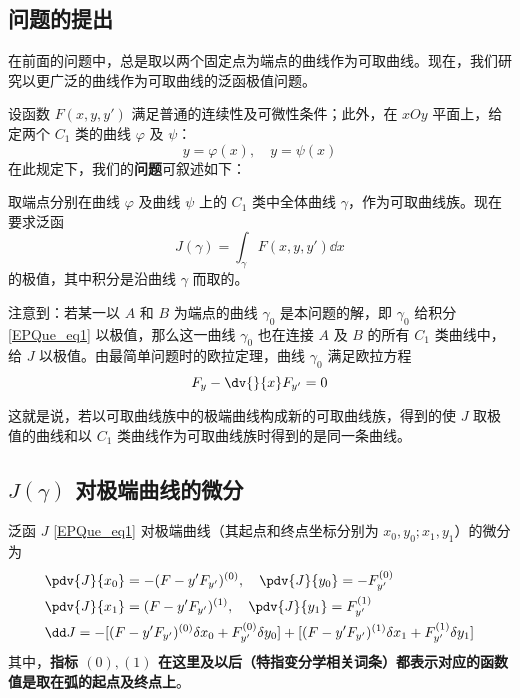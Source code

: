 

\subsection{问题的提出}\label{EPQue_sub1}在前面的问题中，总是取以两个固定点为端点的曲线作为可取曲线。现在，我们研究以更广泛的曲线作为可取曲线的泛函极值问题。

设函数 $F(x,y,y')$ 满足普通的连续性及可微性条件；此外，在 $xOy$ 平面上，给定两个 $C_1$ 类的曲线 $\varphi$ 及 $\psi$：
\begin{equation}
y=\varphi(x),\quad y=\psi(x)
\end{equation}
在此规定下，我们的\textbf{问题}可叙述如下：

取端点分别在曲线 $\varphi$ 及曲线 $\psi$ 上的 $C_1$ 类中全体曲线 $\gamma$，作为可取曲线族。现在要求泛函
\begin{equation}\label{EPQue_eq1}
J(\gamma)=\int_\gamma F(x,y,y')\dd x
\end{equation}
的极值，其中积分是沿曲线 $\gamma$ 而取的。

注意到：若某一以 $A$ 和 $B$ 为端点的曲线 $\gamma_0$ 是本问题的解，即 $\gamma_0$ 给积分\autoref{EPQue_eq1} 以极值，那么这一曲线 $\gamma_0$ 也在连接 $A$ 及 $B$ 的所有 $C_1$ 类曲线中，给 $J$ 以极值。由最简单问题时的欧拉定理，曲线 $\gamma_0$ 满足欧拉方程
\begin{equation}
F_y-\dv{}{x}F_{y'}=0
\end{equation}

这就是说，若以可取曲线族中的极端曲线构成新的可取曲线族，得到的使 $J$ 取极值的曲线和以 $C_1$ 类曲线作为可取曲线族时得到的是同一条曲线。
\subsection{$J(\gamma)$ 对极端曲线的微分} 
\begin{theorem}{}\label{EPQue_the1}
泛函 $J$ \autoref{EPQue_eq1} 对极端曲线（其起点和终点坐标分别为 $x_0,y_0;x_1,y_1$）的微分为
\begin{equation}\label{EPQue_eq5}
\begin{aligned}
&\pdv{J}{x_0}=-(F-y'F_{y'})^{(0)},\quad \pdv{J}{y_0}=-F_{y'}^{(0)}\\
&\pdv{J}{x_1}=(F-y'F_{y'})^{(1)},\quad \pdv{J}{y_1}=F_{y'}^{(1)}\\
&\dd J=-[(F-y'F_{y'})^{(0)}\delta {x_0}+ F_{y'}^{(0)}\delta y_0]+[(F-y'F_{y'})^{(1)}\delta {x_1}+F_{y'}^{(1)}\delta y_1]
\end{aligned}
\end{equation}
其中，\textbf{指标 ${(0)},{(1)}$ 在这里及以后（特指变分学相关词条）都表示对应的函数值是取在弧的起点及终点上}。
\end{theorem}
